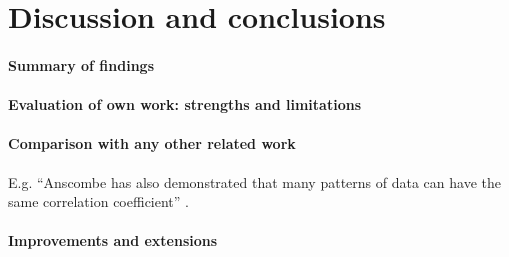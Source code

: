 \documentclass[11pt,a4paper]{article}
\begin{document}

\section{Discussion and conclusions}

\paragraph{Summary of findings}

\paragraph{Evaluation of own work: strengths and limitations}

\paragraph{Comparison with any other related work}
E.g. ``Anscombe has also demonstrated that many patterns of data can
have the same correlation coefficient'' \cite{Ansc73Grap}.

\paragraph{Improvements and extensions}



\end{document}
